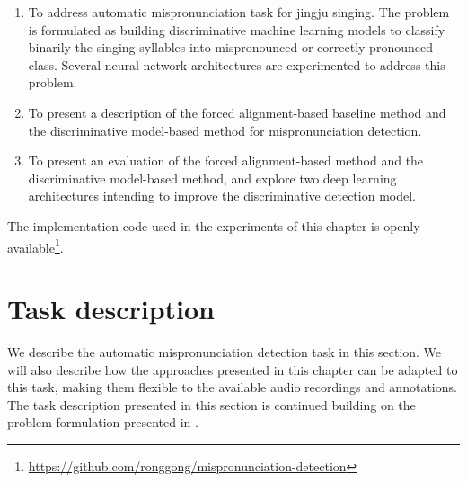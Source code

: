 \begin{enumerate}[leftmargin=*]
\item To address automatic mispronunciation task for jingju singing. The problem is formulated as building discriminative machine learning models to classify binarily the singing syllables into mispronounced or correctly pronounced class. Several neural network architectures are experimented to address this problem.
\item To present a description of the forced alignment-based baseline method and the discriminative model-based method for mispronunciation detection.
\item To present an evaluation of the forced alignment-based method and the discriminative model-based method, and explore two deep learning architectures intending to improve the discriminative detection model. 
\end{enumerate}

The implementation code used in the experiments of this chapter is openly available\footnote{\url{https://github.com/ronggong/mispronunciation-detection}}.

\section{Task description}

We describe the automatic mispronunciation detection task in this section. We will also describe how the approaches presented in this chapter can be adapted to this task, making them flexible to the available audio recordings and annotations. The task description presented in this section is continued building on the problem formulation presented in .

